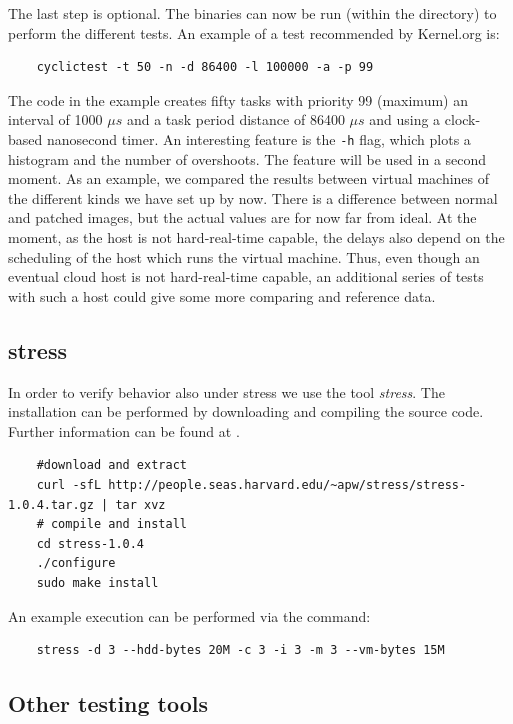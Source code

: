 \documentclass[]{scrartcl}
\begin{document}
The last step is optional. The binaries can now be run (within the directory) to perform the different tests. An example of a test recommended by Kernel.org is: 

\begin{verbatim}
	cyclictest -t 50 -n -d 86400 -l 100000 -a -p 99
\end{verbatim}

The code in the example creates fifty tasks with priority 99 (maximum) an interval of 1000 $\mu s$ and a task period distance of 86400 $\mu s$ and using a clock-based nanosecond timer.
An interesting feature is the \texttt{-h} flag, which plots a histogram and the number of overshoots. The feature will be used in a second moment.
As an example, we compared the results between virtual machines of the different kinds we have set up by now. There is a difference between normal and patched images, but the actual values are for now far from ideal. 
At the moment, as the host is not hard-real-time capable, the delays also depend on the scheduling of the host which runs the virtual machine. Thus, even though an eventual cloud host is not hard-real-time capable, an additional series of tests with such a host could give some more comparing and reference data.

\subsection{stress}

In order to verify behavior also under stress we use the tool \textit{stress}. The installation can be performed by downloading and compiling the source code. Further information can be found at \cite{stress01}.

\begin{verbatim}
	#download and extract
	curl -sfL http://people.seas.harvard.edu/~apw/stress/stress-1.0.4.tar.gz | tar xvz
	# compile and install
	cd stress-1.0.4
	./configure
	sudo make install
\end{verbatim}

An example execution can be performed via the command:

\begin{verbatim}
	stress -d 3 --hdd-bytes 20M -c 3 -i 3 -m 3 --vm-bytes 15M
\end{verbatim}

\subsection{Other testing tools}
\end{document}
